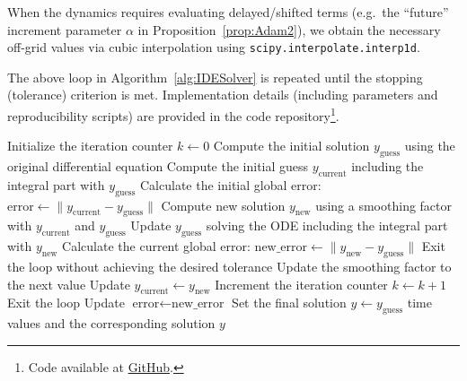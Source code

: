\documentclass{article} %
\begin{document}
When the dynamics requires evaluating delayed/shifted terms (e.g.\ the ``future'' increment parameter $\alpha$ in Proposition~\ref{prop:Adam2}), we obtain the necessary off-grid values via cubic interpolation using
\texttt{scipy.interpolate.interp1d}.

The above loop in Algorithm~\ref{alg:IDESolver} is repeated until the stopping (tolerance) criterion is met. Implementation details (including parameters and
reproducibility scripts) are provided in the code repository\footnote{Code available at \href{https://github.com/carlosherediapimienta/nonlocal-adam}{GitHub}.}.

\begin{algorithm}[t!]
\caption{Iterative Modified IDESolver Method}
\label{alg:IDESolver}
\begin{algorithmic}[1]
\State Initialize the iteration counter $k \gets 0$
\State Compute the initial solution $y_{\text{guess}}$ using the original differential equation
\State Compute the initial guess $y_{\text{current}}$ including the integral part with $y_{\text{guess}}$
\State Calculate the initial global error: $\text{error} \gets \| y_{\text{current}} - y_{\text{guess}} \|$
    \State Compute new solution $y_{\text{new}}$ using a smoothing factor with $y_{\text{current}}$ and $y_{\text{guess}}$
    \State Update $y_{\text{guess}}$ solving the ODE including the integral part with $y_{\text{new}}$
    \State Calculate the current global error: $\text{new\_error} \gets \| y_{\text{new}} - y_{\text{guess}} \|$
            \State Exit the loop without achieving the desired tolerance
        \Else
            \State Update the smoothing factor to the next value
        \EndIf
    \EndIf
    \State Update $y_{\text{current}} \gets y_{\text{new}}$
    \State Increment the iteration counter $k \gets k + 1$
        \State Exit the loop
    \EndIf
    \State Update $\text{error} \gets \text{new\_error}$
\EndWhile
\State Set the final solution $y \gets y_{\text{guess}}$
\State \Return time values and the corresponding solution $y$
\end{algorithmic}
\end{algorithm}
\end{document}
